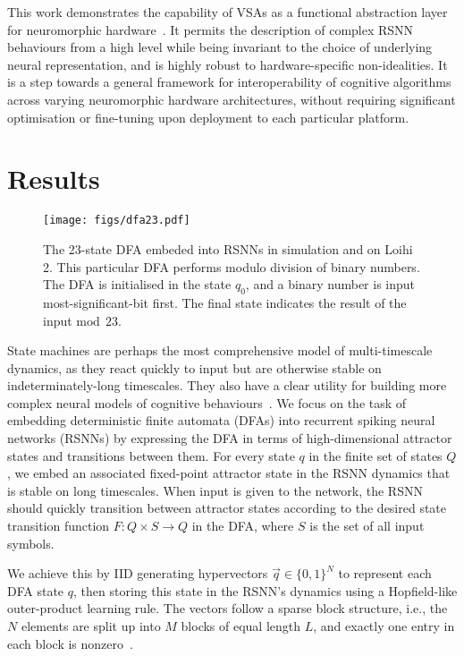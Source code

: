 This work demonstrates the capability of VSAs as a functional abstraction layer for neuromorphic hardware~\cite{kleyko_vector_2022}. It permits the description of complex RSNN behaviours from a high level while being invariant to the choice of underlying neural representation, and is highly robust to hardware-specific non-idealities. It is a step towards a general framework for interoperability of cognitive algorithms across varying neuromorphic hardware architectures, without requiring significant optimisation or fine-tuning upon deployment to each particular platform.






\section{Results}


\begin{figure}
    \centering
    \texttt{[image: figs/dfa23.pdf]}
    \caption{The 23-state DFA embeded into RSNNs in simulation and on Loihi 2. This particular DFA performs modulo division of binary numbers. The DFA is initialised in the state $q_0$, and a binary number is input most-significant-bit first. The final state indicates the result of the input $\mathrm{mod} \: \: 23$.}
    \label{fig:dfa_23}
\end{figure}

State machines are perhaps the most comprehensive model of multi-timescale dynamics, as they react quickly to input but are otherwise stable on indeterminately-long timescales. They also have a clear utility for building more complex neural models of cognitive behaviours~\cite{neftci_synthesizing_2013, dayan_simple_2008, liang_neuromorphic_2019}.
We focus on the task of embedding deterministic finite automata (DFAs) into recurrent spiking neural networks (RSNNs) by expressing the DFA in terms of high-dimensional attractor states and transitions between them.
For every state $q$ in the finite set of states $Q$, we embed an associated fixed-point attractor state in the RSNN dynamics that is stable on long timescales. When input is given to the network, the RSNN should quickly transition between attractor states according to the desired state transition function $F: Q \times S \rightarrow Q$ in the DFA, where $S$ is the set of all input symbols.



We achieve this by IID generating hypervectors $\vec{q} \in \{0,1 \}^N$ to represent each DFA state $q$, then storing this state in the RSNN's dynamics using a Hopfield-like outer-product learning rule. The vectors follow a sparse block structure, i.e., the $N$ elements are split up into $M$ blocks of equal length $L$, and exactly one entry in each block is nonzero~\cite{laiho_high-dimensional_2015, frady_variable_2023}.

